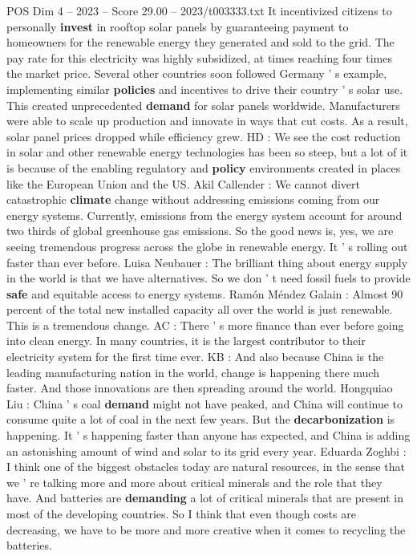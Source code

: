 \begin{textsample}{POS Dim 4 – 2023 – Score 29.00 – 2023/t003333.txt}
It incentivized citizens to personally \textbf{invest} in rooftop solar panels by guaranteeing payment to homeowners for the renewable energy they generated and sold to the grid.
The pay rate for this electricity was highly subsidized, at times reaching four times the market price.
Several other countries soon followed Germany ' s example, implementing similar \textbf{policies} and incentives to drive their country ' s solar use.
This created unprecedented \textbf{demand} for solar panels worldwide.
Manufacturers were able to scale up production and innovate in ways that cut costs.
As a result, solar panel prices dropped while efficiency grew.
HD : We see the cost reduction in solar and other renewable energy technologies has been so steep, but a lot of it is because of the enabling regulatory and \textbf{policy} environments created in places like the European Union and the US.
Akil Callender : We cannot divert catastrophic \textbf{climate} change without addressing emissions coming from our energy systems.
Currently, emissions from the energy system account for around two thirds of global greenhouse gas emissions.
So the good news is, yes, we are seeing tremendous progress across the globe in renewable energy.
It ' s rolling out faster than ever before.
Luisa Neubauer : The brilliant thing about energy supply in the world is that we have alternatives.
So we don ' t need fossil fuels to provide \textbf{safe} and equitable access to energy systems.
Ramón Méndez Galain : Almost 90 percent of the total new installed capacity all over the world is just renewable.
This is a tremendous change.
AC : There ' s more finance than ever before going into clean energy.
In many countries, it is the largest contributor to their electricity system for the first time ever.
KB : And also because China is the leading manufacturing nation in the world, change is happening there much faster.
And those innovations are then spreading around the world.
Hongquiao Liu : China ' s coal \textbf{demand} might not have peaked, and China will continue to consume quite a lot of coal in the next few years.
But the \textbf{decarbonization} is happening.
It ' s happening faster than anyone has expected, and China is adding an astonishing amount of wind and solar to its grid every year.
Eduarda Zoghbi : I think one of the biggest obstacles today are natural resources, in the sense that we ' re talking more and more about critical minerals and the role that they have.
And batteries are \textbf{demanding} a lot of critical minerals that are present in most of the developing countries.
So I think that even though costs are decreasing, we have to be more and more creative when it comes to recycling the batteries.

\end{textsample}

